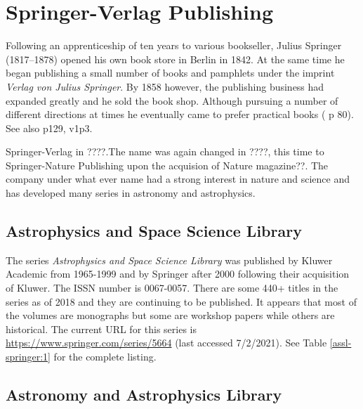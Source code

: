 \section{Springer-Verlag Publishing}

Following an apprenticeship of ten years to various bookseller, Julius
Springer (1817--1878) opened his own book store in Berlin in 1842. At
the same time he began publishing a small number of books and pamphlets
under the imprint {\itshape Verlag von Julius Springer}.  By 1858 however,
the publishing business had expanded greatly and he sold the book
shop. Although pursuing a number of different directions at times he
eventually came to prefer practical books (\cite{Sarkowski1996} p 80).
See also p129, v1p3.

Springer-Verlag in ????.The name was again changed in ????, this time
to Springer-Nature Publishing upon the acquision of Nature magazine??.
The company under what ever name had a strong interest in nature and
science and has developed many series in astronomy and astrophysics.

\subsection{Astrophysics and Space Science Library}

The series {\itshape Astrophysics and Space Science Library} was
published by Kluwer Academic from 1965-1999 and by Springer after 2000
following their acquisition of Kluwer.  The ISSN number is
0067-0057. There are some 440+ titles in the series as of 2018 and
they are continuing to be published.  It appears that most of the
volumes are monographs but some are workshop papers while others are
historical. The current URL for this series is
\url{https://www.springer.com/series/5664} (last accessed 7/2/2021).
See Table \ref{assl-springer:1} for the complete listing.

\subsection{Astronomy and Astrophysics Library}
  
